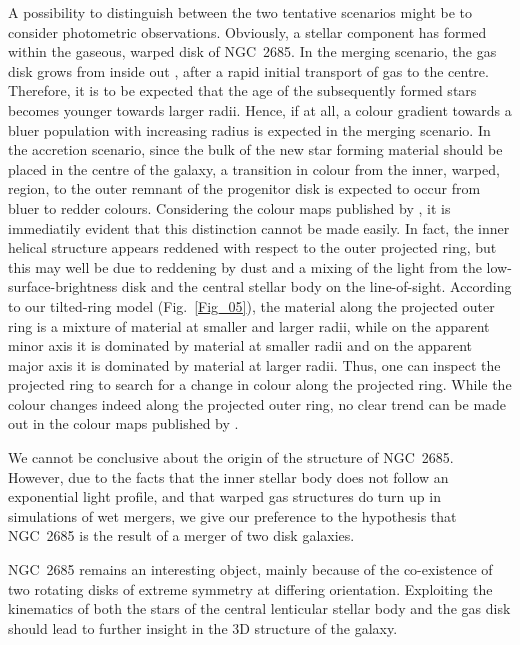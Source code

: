 \documentclass[oldversion]{aa}
\begin{document}
A possibility to distinguish between the two tentative scenarios might
be to consider photometric observations. Obviously, a stellar
component has formed within the gaseous, warped disk of NGC~2685. In
the merging scenario, the gas disk grows from inside out
\citep[][]{Barnes02}, after a rapid initial transport of gas to the
centre. Therefore, it is to be expected that the age of the
subsequently formed stars becomes younger towards larger radii. Hence,
if at all, a colour gradient towards a bluer population with
increasing radius is expected in the merging scenario. In the
accretion scenario, since the bulk of the new star forming material
should be placed in the centre of the galaxy, a transition in colour
from the inner, warped, region, to the outer remnant of the progenitor
disk is expected to occur from bluer to redder colours.  Considering
the colour maps published by \citet[][]{Erwin02}, it is immediatily
evident that this distinction cannot be made easily. In fact, the
inner helical structure appears reddened with respect to the outer
projected ring, but this may well be due to reddening by dust and a
mixing of the light from the low-surface-brightness disk and the
central stellar body on the line-of-sight. According to our
tilted-ring model (Fig.~\ref{Fig_05}), the material along the
projected outer ring is a mixture of material at smaller and larger
radii, while on the apparent minor axis it is dominated by material at
smaller radii and on the apparent major axis it is dominated by
material at larger radii. Thus, one can inspect the projected ring to
search for a change in colour along the projected ring. While the
colour changes indeed along the projected outer ring, no clear trend
can be made out in the colour maps published by \citet[][]{Erwin02}.

We cannot be conclusive about the origin of the structure of
NGC~2685. However, due to the facts that the inner stellar body does
not follow an exponential light profile, and that warped gas
structures do turn up in simulations of wet mergers, we give our
preference to the hypothesis that NGC~2685 is the result of a merger
of two disk galaxies.

NGC~2685 remains an interesting object, mainly because of the
co-existence of two rotating disks of extreme symmetry at differing
orientation. Exploiting the kinematics of both the stars of the
central lenticular stellar body and the gas disk should lead to
further insight in the 3D structure of the galaxy.
\end{document}
